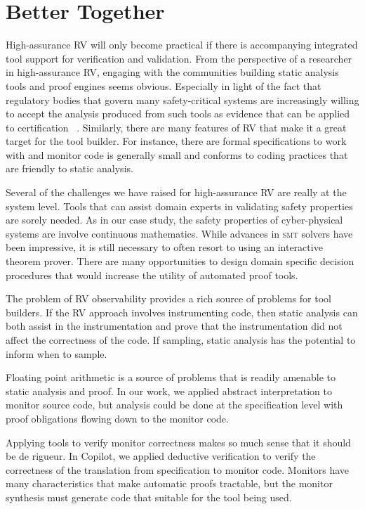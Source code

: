 \section{Better Together}\label{sec:oportunities} 
High-assurance RV will only become practical if there is accompanying
integrated tool support for verification and validation.  From the
perspective of a researcher in high-assurance RV, engaging with the
communities building static analysis tools and proof engines seems
obvious.  Especially in light of the fact that regulatory bodies that
govern many safety-critical systems are increasingly willing to accept
the analysis produced from such tools as evidence that can be applied to
certification ~\cite{DO333}. Similarly, there are many features of RV
that make it a great target for the tool builder. For instance, there are formal
specifications to work with  and monitor code is generally small and
conforms to coding practices that are friendly to static analysis. 

 
Several of the challenges we have raised for high-assurance RV are
really at the system level. Tools that can assist domain experts in
validating safety properties are sorely needed.  As in our case study,
the safety properties of cyber-physical systems are involve continuous
mathematics. While advances in \textsc{smt} solvers have been
impressive, it is still necessary to often resort to using an  interactive
theorem prover. There are many opportunities to design
domain specific decision procedures that would increase the utility of
automated proof
tools.  

The problem of RV observability provides a rich source of problems for tool builders. If the RV
approach involves instrumenting code, then static analysis can both
assist in the instrumentation and prove that the instrumentation did
not affect the correctness of the code. If sampling, static analysis
has the potential to inform when to sample.

Floating point arithmetic is a source of problems that is readily
amenable to static analysis and proof. In our work, we applied
abstract interpretation to monitor source code, but analysis could be
done at the specification level with proof obligations flowing down to
the monitor code.

Applying tools to verify monitor correctness makes so much sense that
it should be de rigueur.  In Copilot, we applied deductive
verification to verify the correctness of the translation from
specification to monitor code.  Monitors have many characteristics
that make automatic proofs tractable, but the monitor synthesis must
generate code that suitable for the tool being used.   